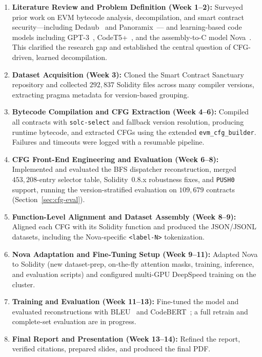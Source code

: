 \documentclass{stylefiles/capstone}
\begin{document}
\begin{enumerate}

\item \textbf{Literature Review and Problem Definition (Week 1--2):}
Surveyed prior work on EVM bytecode analysis, decompilation, and smart contract
security—including Dedaub~\cite{neville2023dedaub} and Panoramix~\cite{panoramix}—
and learning-based code models including GPT-3~\cite{brown2020language},
CodeT5+~\cite{wang2023codet5plus}, and the assembly-to-C model
Nova~\cite{jiang2025nova}. This clarified the research gap and established the
central question of CFG-driven, learned decompilation.

\item \textbf{Dataset Acquisition (Week 3):}
Cloned the Smart Contract Sanctuary repository and collected $292{,}837$ Solidity
files across many compiler versions, extracting pragma metadata for version-based
grouping.

\item \textbf{Bytecode Compilation and CFG Extraction (Week 4--6):}
Compiled all contracts with \texttt{solc-select} and fallback version resolution,
producing runtime bytecode, and extracted CFGs using the extended
\texttt{evm\_cfg\_builder}. Failures and timeouts were logged with a resumable
pipeline.

\item \textbf{CFG Front-End Engineering and Evaluation (Week 6--8):}
Implemented and evaluated the BFS dispatcher reconstruction, merged
$453{,}208$-entry selector table, Solidity~0.8.x robustness fixes, and
\texttt{PUSH0} support, running the version-stratified evaluation on $109{,}679$
contracts (Section~\ref{sec:cfg-eval}).

\item \textbf{Function-Level Alignment and Dataset Assembly (Week 8--9):}
Aligned each CFG with its Solidity function and produced the JSON/JSONL datasets,
including the Nova-specific \texttt{<label-N>} tokenization.

\item \textbf{Nova Adaptation and Fine-Tuning Setup (Week 9--11):}
Adapted Nova to Solidity (new dataset-prep, on-the-fly attention masks, training,
inference, and evaluation scripts) and configured multi-GPU DeepSpeed training on
the cluster.

\item \textbf{Training and Evaluation (Week 11--13):}
Fine-tuned the model and evaluated reconstructions with
BLEU~\cite{papineni2002bleu} and CodeBERT~\cite{feng2020codebert}; a full retrain
and complete-set evaluation are in progress.

\item \textbf{Final Report and Presentation (Week 13--14):}
Refined the report, verified citations, prepared slides, and produced the final
PDF.

\end{enumerate}
\end{document}
